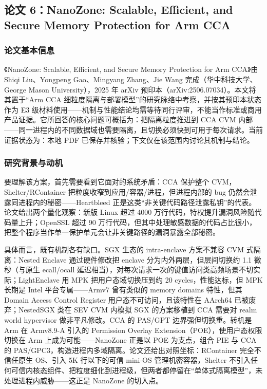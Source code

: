 \documentclass[11pt]{ctexart}
\begin{document}
\subsection{论文 6：NanoZone: Scalable, Efficient, and Secure Memory Protection for Arm CCA}
\subsubsection{论文基本信息}
《NanoZone: Scalable, Efficient, and Secure Memory Protection for Arm CCA》由 Shiqi Liu、Yongpeng Gao、Mingyang Zhang、Jie Wang 完成（华中科技大学、George Mason University），2025 年 arXiv 预印本（arXiv:2506.07034）。本文将其置于“Arm CCA 细粒度隔离与部署模型”的研究脉络中考察，并按其预印本状态作为 E3 级材料使用——机制与性能结论均需等待同行评审，不能当作标准或商用产品证据。它所回答的核心问题可概括为：把隔离粒度推进到 CCA CVM 内部——同一进程内的不同数据域也需要隔离，且切换必须快到可用于每次请求。当前证据状态为：本地 PDF 已保存并核验；下文仅在该范围内讨论其机制与结论。\cite{liu2025nanozone}\par
\subsubsection{研究背景与动机}
要理解该方案，首先需要看到它面对的系统矛盾：CCA 保护整个 CVM，Shelter/RContainer 把粒度收窄到应用/容器/进程，但进程内部的 bug 仍然会泄露同进程内的秘密——Heartbleed 正是这类“非关键代码路径泄露私钥”的代表。论文给出两个量化观察：新版 Linux 超过 4000 万行代码，特权提升漏洞风险随代码量上升；OpenSSL 超过 90 万行代码，但其中处理敏感数据的代码占比很小，把整个程序当作单一保护单元会让非关键路径的漏洞暴露全部秘密。\par
具体而言，既有机制各有缺口。SGX 生态的 intra-enclave 方案不兼容 CVM 式隔离：Nested Enclave 通过硬件修改把 enclave 分为内外两层，但层间切换约 1.1 微秒（与原生 ecall/ocall 延迟相当），对每次请求一次的键值访问类高频场景不切实际；LightEnclave 用 MPK 把用户态域切换压到约 20 cycles，性能达标，但 MPK 长期是 Intel 平台专属——Armv7 曾有类似的 memory domains 特性，但其 Domain Access Control Register 用户态不可访问，且该特性在 AArch64 已被废弃；NestedSGX 类在 SEV CVM 内模拟 SGX 的方案移植到 CCA 需要对 realm world hypervisor 做非平凡修改。CCA 的 PAS/GPT 边界强但切换重。转机是 Arm 在 Armv8.9-A 引入的 Permission Overlay Extension（POE），使用户态权限切换在 Arm 上成为可能——NanoZone 正是以 POE 为支点，组合 PIE 与 CCA 的 PAS/GPC3，构造进程内多域隔离。论文还给出对照坐标：RContainer 完全不信任原生 OS、引入 5K 行以下的可信 mini-OS 管理机密容器，Shelter 不引入任何可信内核态组件、把粒度细化到进程级，但两者都停留在“单体式隔离模型”，未处理进程内威胁——这正是 NanoZone 的切入点。\par
\end{document}
